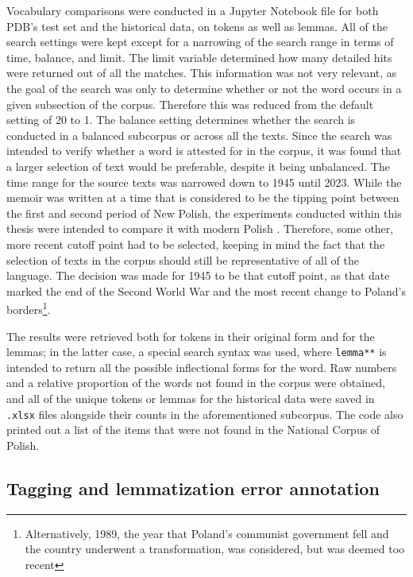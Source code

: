 Vocabulary comparisons were conducted in a Jupyter Notebook file for both PDB's test set and the historical data, on tokens as well as lemmas. All of the search settings were kept except for a narrowing of the search range in terms of time, balance, and limit. The limit variable determined how many detailed hits were returned out of all the matches. This information was not very relevant, as the goal of the search was only to determine whether or not the word occurs in a given subsection of the corpus. Therefore this was reduced from the default setting of 20 to 1. The balance setting determines whether the search is conducted in a balanced subcorpus or across all the texts. Since the search was intended to verify whether a word is attested for in the corpus, it was found that a larger selection of text would be preferable, despite it being unbalanced. The time range for the source texts was narrowed down to 1945 until 2023. While the memoir was written at a time that is considered to be the tipping point between the first and second period of New Polish, the experiments conducted within this thesis were intended to compare it with modern Polish \citep{długosz-kurczabowa_dubisz_2006}. Therefore, some other, more recent cutoff point had to be selected, keeping in mind the fact that the selection of texts in the corpus should still be representative of all of the language. The decision was made for 1945 to be that cutoff point, as that date marked the end of the Second World War and the most recent change to Poland's borders\footnote{Alternatively, 1989, the year that Poland's communist government fell and the country underwent a transformation, was considered, but was deemed too recent}.

The results were retrieved both for tokens in their original form and for the lemmas; in the latter case, a special search syntax was used, where \texttt{lemma**} is intended to return all the possible inflectional forms for the word. Raw numbers and a relative proportion of the words not found in the corpus were obtained, and all of the unique tokens or lemmas for the historical data were saved in \texttt{.xlsx} files alongside their counts in the aforementioned subcorpus. The code also printed out a list of the items that were not found in the National Corpus of Polish. 

\subsection{Tagging and lemmatization error annotation}
\label{subsec:error-annotation}

